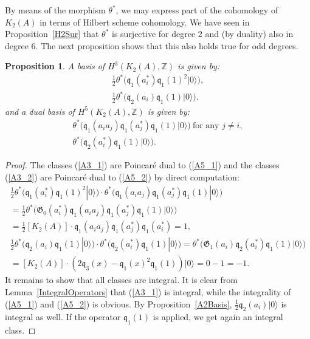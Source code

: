 \documentclass{alggeom}
\newcommand{\vac}{|0\rangle}
\newcommand{\G}{\mathfrak{G}}
\newcommand{\q}{\mathfrak{q}}
\newcommand{\kum}[2]{K_{ #2 }( #1 )}
\newcommand{\X}{\kum{A}{2}}
\newcommand{\Z}{\mathbb{Z}}
\theoremstyle{plain}
\newtheorem{proposition}[theorem]{Proposition}
\theoremstyle{definition}
\theoremstyle{remark}
\begin{document}
By means of the morphism $\theta^*$, we may express part of the cohomology of $\kum{A}{2}$ in terms of Hilbert scheme cohomology. We have seen in Proposition~\ref{H2Sur} that $\theta^*$ is surjective for degree $2$ and (by duality) also in degree $6$. 
The next proposition shows that this also holds true for odd degrees.
\begin{proposition}\label{oddcohomology}
A basis of $H^3(\X,\Z)$ is given by:
\begin{gather}
\label{A3_1}
\frac{1}{2}\theta^*\Big( \q_1(a^*_i)\q_1(1)^2\vac \Big), \\
\label{A3_2}
\frac{1}{2}\theta^*\Big(\q_2(a_i)\q_1(1)\vac\Big).
\end{gather}
and a dual basis of $H^5(\X,\Z)$ is given by:
\begin{gather}
\label{A5_1}
 \theta^*\Big( \q_1(a_ia_j)\q_1(a_j^*)\q_1(1) \vac \Big) \ \text{for any } j\neq i, \\
\label{A5_2}
\theta^*\Big( \q_2(a^*_i)\q_1(1)\vac \Big).
\end{gather}
\end{proposition}
\begin{proof}
The classes (\ref{A3_1}) are Poincar\'e dual to (\ref{A5_1}) and the classes (\ref{A3_2}) are Poincar\'e dual to (\ref{A5_2}) by direct computation:
\begin{gather*}
\frac{1}{2}\theta^*\Big( \q_1(a^*_i)\q_1(1)^2\vac \Big)\cdot \theta^*\Big( \q_1(a_ia_j)\q_1(a_j^*)\q_1(1) \vac \Big) \hspace{80pt}
\\ = \frac{1}{2} \theta^*\Big(  \G_0(a^*_i) \q_1(a_ia_j)\q_1(a_j^*)\q_1(1) \vac \Big)\\
 =  \frac{1}{2}[\X]\cdot \q_1(a_ia_j)\q_1(a_j^*)\q_1(a_i^*) = 1, \\
 \frac{1}{2}\theta^*\Big(\q_2(a_i)\q_1(1)\vac\Big)\cdot \theta^*\Big( \q_2(a^*_i)\q_1(1)\vac \Big) =\theta^*\Big( \G_1(a_i)\q_2(a^*_i)\q_1(1)\vac  \Big) \\
 = [\X]\cdot \left( 2\q_3(x) - \q_1(x)^2\q_1(1) \right) \vac = 0-1=-1.
\end{gather*}
It remains to show that all classes are integral.
It is clear from Lemma~\ref{IntegralOperators} that (\ref{A3_1}) is integral, while the integrality of (\ref{A5_1}) and (\ref{A5_2}) is obvious. By Proposition~\ref{A2Basis}, $\frac{1}{2}\q_2(a_i)\vac$ is integral as well. If the operator $ \q_1(1)$ is applied, we get again an integral class.
\end{proof}
\end{document}
